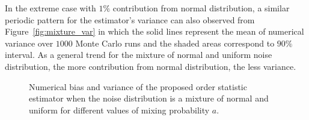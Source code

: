 \documentclass[journal]{IEEEtran}
\begin{document}
In the extreme case with $1\%$ contribution from normal distribution, a similar periodic pattern for the estimator's variance can also observed from Figure~\ref{fig:mixture_var} in which the solid lines represent the mean of numerical variance over $1000$ Monte Carlo runs and the shaded areas correspond to $90\%$ interval.  As a general trend for the mixture of normal and uniform noise distribution, the more contribution from normal distribution, the less variance.
%
%
\begin{figure}[!t]
	\centering
	\hfil
	\caption{Numerical bias and variance of the proposed order statistic estimator when the noise distribution is a  mixture of normal and uniform for different values of mixing probability $a$. }
	\label{fig:mixture_order}
\end{figure}
%
%
\end{document}
